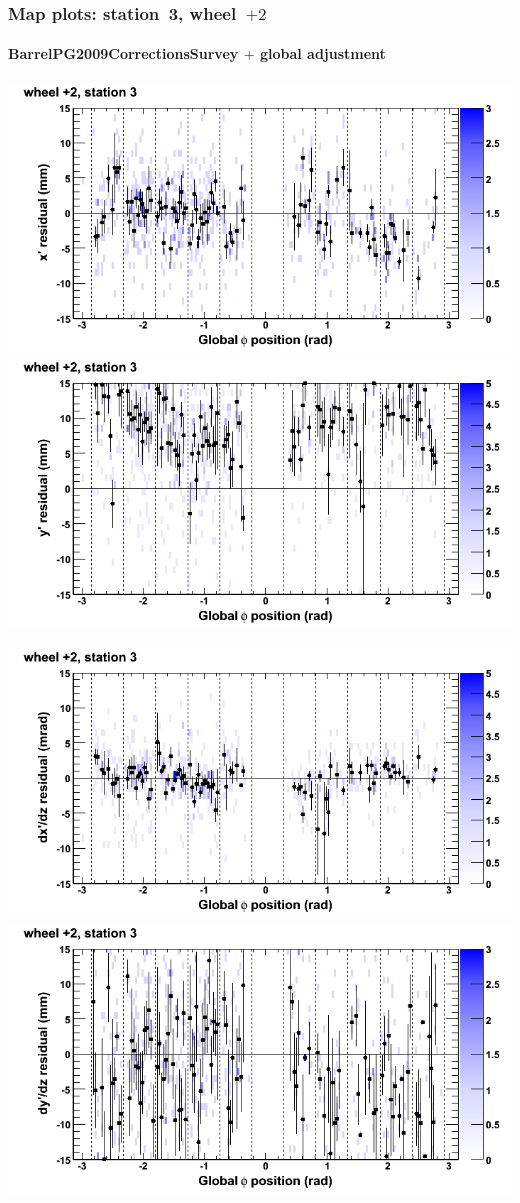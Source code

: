\documentclass[compress]{beamer}
\begin{document}
\begin{frame}
\frametitle{Map plots: station~3, wheel~$+2$}
\framesubtitle{BarrelPG2009CorrectionsSurvey $+$ global adjustment}
\includegraphics[width=0.5\linewidth]{mapplots_re01/DTvsphi_st3whE_x.png}
\includegraphics[width=0.5\linewidth]{mapplots_re01/DTvsphi_st3whE_y.png}

\includegraphics[width=0.5\linewidth]{mapplots_re01/DTvsphi_st3whE_dxdz.png}
\includegraphics[width=0.5\linewidth]{mapplots_re01/DTvsphi_st3whE_dydz.png}
\end{frame}
\end{document}
